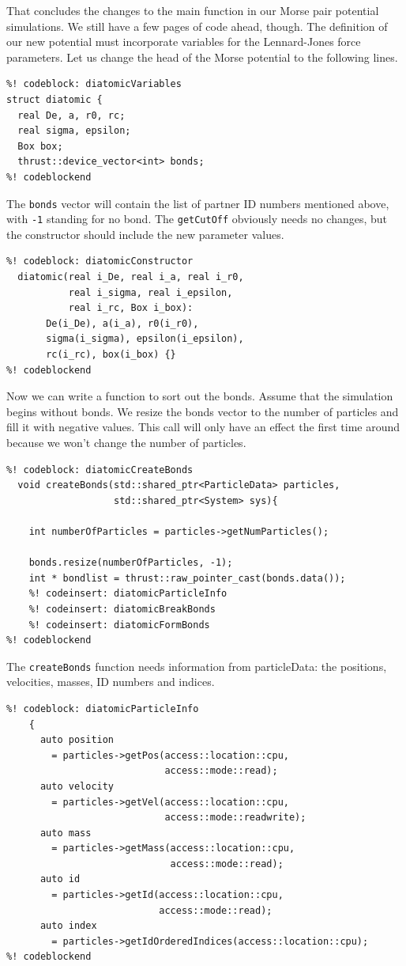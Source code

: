 That concludes the changes to the main function in our Morse pair potential 
simulations. We still have a few pages of code ahead, though. The definition of 
our new potential must incorporate variables for the Lennard-Jones force 
parameters. Let us change the head of the Morse potential to the following 
lines.
\begin{lstlisting}
%! codeblock: diatomicVariables
struct diatomic {
  real De, a, r0, rc;
  real sigma, epsilon;
  Box box;
  thrust::device_vector<int> bonds;
%! codeblockend
\end{lstlisting}
The \texttt{bonds} vector will contain the list of partner ID numbers mentioned 
above, with \texttt{-1} standing for no bond. The \texttt{getCutOff} obviously 
needs no changes, but the constructor should include the new parameter values.
\begin{lstlisting}
%! codeblock: diatomicConstructor
  diatomic(real i_De, real i_a, real i_r0,
           real i_sigma, real i_epsilon,
           real i_rc, Box i_box):
       De(i_De), a(i_a), r0(i_r0),
       sigma(i_sigma), epsilon(i_epsilon),
       rc(i_rc), box(i_box) {}
%! codeblockend
\end{lstlisting}
Now we can write a function to sort out the bonds. Assume that the simulation 
begins without bonds. We resize the bonds vector to the number of particles and 
fill it with negative values. This call will only have an effect the first time 
around because we won't change the number of particles.
\begin{lstlisting}
%! codeblock: diatomicCreateBonds
  void createBonds(std::shared_ptr<ParticleData> particles,
                   std::shared_ptr<System> sys){

    int numberOfParticles = particles->getNumParticles();

    bonds.resize(numberOfParticles, -1);
    int * bondlist = thrust::raw_pointer_cast(bonds.data());
    %! codeinsert: diatomicParticleInfo
    %! codeinsert: diatomicBreakBonds
    %! codeinsert: diatomicFormBonds
%! codeblockend
\end{lstlisting}
The \texttt{createBonds} function needs information from particleData: the
positions, velocities, masses, ID numbers and indices.
\begin{lstlisting}
%! codeblock: diatomicParticleInfo
  	{
      auto position
        = particles->getPos(access::location::cpu,
                            access::mode::read);
      auto velocity
        = particles->getVel(access::location::cpu,
                            access::mode::readwrite);
      auto mass
        = particles->getMass(access::location::cpu,
                             access::mode::read);
      auto id
        = particles->getId(access::location::cpu,
                           access::mode::read);
      auto index
        = particles->getIdOrderedIndices(access::location::cpu);
%! codeblockend
\end{lstlisting}

